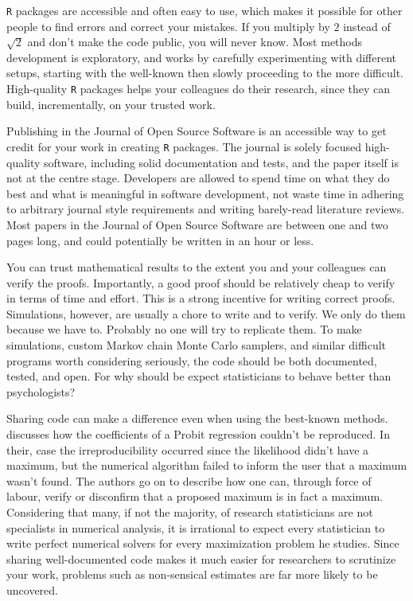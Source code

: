 \texttt{R} packages are accessible and often easy to use, which makes it possible for other people to find errors and correct your mistakes. If you multiply by $2$ instead of $\sqrt{2}$ and don't make the code public, you will never know. Most methods development is exploratory, and works by carefully experimenting with different setups, starting with the well-known then slowly proceeding to the more difficult. High-quality \texttt{R} packages helps your colleagues do their research, since they can build, incrementally, on your trusted work.  

Publishing in the Journal of Open Source Software is an accessible way to get credit for your work in creating \texttt{R} packages. The journal is solely focused high-quality software, including solid documentation and tests, and the paper itself is not at the centre stage. Developers are allowed to spend time on what they do best and what is meaningful in software development, not waste time in adhering to arbitrary journal style requirements and writing barely-read literature reviews. Most papers in the Journal of Open Source Software are between one and two pages long, and could potentially be written in an hour or less. 

You can trust mathematical results to the extent you and your colleagues can verify the proofs. Importantly, a good proof should be relatively cheap to verify in terms of time and effort. This is a strong incentive for writing correct proofs. Simulations, however, are usually a chore to write and to verify. We only do them because we have to. Probably no one will try to replicate them. To make simulations, custom Markov chain Monte Carlo samplers, and similar difficult programs worth considering seriously, the code should be both documented, tested, and open. For why should be expect statisticians to behave better than psychologists?

Sharing code can make a difference even when using the best-known methods. \textcite{McCullough2003-zd} discusses how the coefficients of a Probit regression couldn't be reproduced. In their, case the irreproducibility occurred since the likelihood didn't have a maximum, but the numerical algorithm failed to inform the user that a maximum wasn't found. The authors go on to describe how one can, through force of labour, verify or disconfirm that a proposed maximum is in fact a maximum. Considering that many, if not the majority, of research statisticians are not specialists in numerical analysis, it is irrational to expect every statistician to write perfect numerical solvers for every maximization problem he studies. Since sharing well-documented code makes it much easier for researchers to scrutinize your work, problems such as non-sensical estimates are far more likely to be uncovered.

